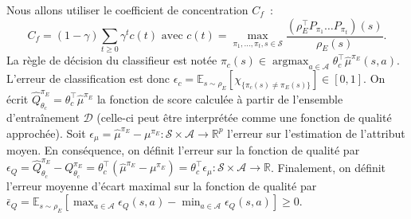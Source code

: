 \documentclass[english,utf8]{./hermes-journal}
\newcommand{\argmax}{\operatorname*{argmax}} %
\newcommand{\s}{\mathcal{S}}
\newcommand{\A}{\mathcal{A}}
\newcommand{\D}{\mathcal{D}}
\newcommand{\E}{\mathbb{E}}
\begin{document}
Nous allons utiliser le coefficient de concentration $C_f$~\cite{Munos:2007}:
\begin{equation}
  C_f = (1-\gamma)\sum_{t\geq 0} \gamma^t c(t) \text{ avec } c(t) =
  \max_{\pi_1,\dots,\pi_t,s\in\s}\frac{(\rho_E^\top P_{\pi_1}\dots
  P_{\pi_t})(s)}{\rho_E(s)}.
\end{equation}
La règle de décision du classifieur est notée $\pi_c(s) \in
\argmax_{a\in \A} \theta_c^\top\hat{\mu}^{\pi_E}(s,a)$. L'erreur de classification est donc $\epsilon_c =
\E_{s\sim\rho_E}[\chi_{\{\pi_c(s)\neq\pi_E(s)\}}] \in [0,1]$. On écrit $\hat{Q}^{\pi_E}_{\theta_c} = \theta_c^\top \hat{\mu}^{\pi_E}$ la fonction de score calculée à partir de l'ensemble d'entraînement $\D$ (celle-ci peut être interprétée comme une fonction de qualité approchée). Soit 
$\epsilon_{\mu} = \hat{\mu}^{\pi_E} - \mu^{\pi_E}:\s\times\A
\rightarrow  \mathbb{R}^p$ l'erreur sur l'estimation de l'attribut moyen.
En conséquence, on définit l'erreur sur la fonction de qualité par 
$\epsilon_Q = \hat{Q}^{\pi_E}_{\theta_c} - Q^{\pi_E}_{\theta_c} =
\theta_c^\top(\hat{\mu}^{\pi_E} - \mu^{\pi_E}) = \theta_c^\top
\epsilon_\mu:\s\times\A\rightarrow\mathbb{R}$. Finalement, on définit l'erreur moyenne d'écart maximal sur la fonction de qualité par $\bar{\epsilon}_Q =
\E_{s\sim\rho_E}[\max_{a\in\A}\epsilon_Q(s,a) -
\min_{a\in\A}\epsilon_Q(s,a)]\geq 0$.
\end{document}
